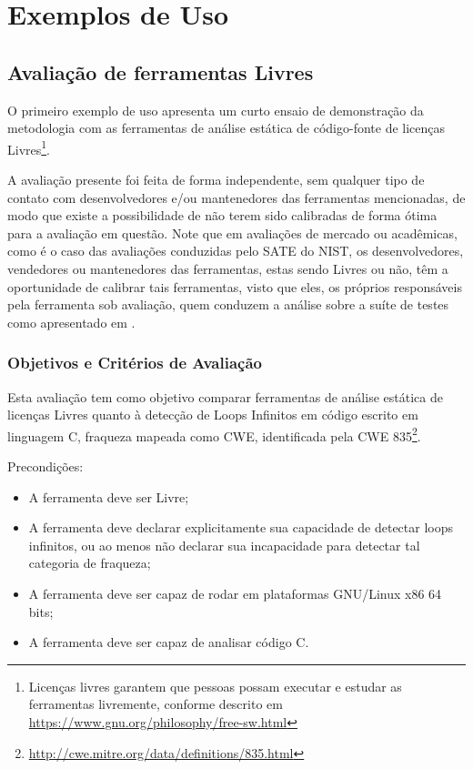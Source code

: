 \chapter{Exemplos de Uso}\label{exemplos_de_uso}

\section{Avaliação de ferramentas Livres}

O primeiro exemplo de uso apresenta um curto ensaio de demonstração da metodologia com as ferramentas de análise estática de código-fonte de licenças Livres\footnote{Licenças livres garantem que pessoas possam executar e estudar as ferramentas livremente, conforme descrito em \url{https://www.gnu.org/philosophy/free-sw.html}}. 

A avaliação presente foi feita de forma independente, sem qualquer tipo de contato com desenvolvedores e/ou mantenedores das ferramentas mencionadas, de modo que existe a possibilidade de não terem sido calibradas de forma ótima para a avaliação em questão. Note que em avaliações de mercado ou acadêmicas, como é o caso das avaliações conduzidas pelo SATE do NIST, os desenvolvedores, vendedores ou mantenedores das ferramentas, estas sendo Livres ou não, têm a oportunidade de calibrar tais ferramentas, visto que eles, os próprios responsáveis pela ferramenta sob avaliação, quem conduzem a análise sobre a suíte de testes como apresentado em \cite{sate_iv}.

\subsection{Objetivos e Critérios de Avaliação}

Esta avaliação tem como objetivo comparar ferramentas de análise estática de licenças Livres quanto à detecção de Loops Infinitos em código escrito em linguagem C, fraqueza mapeada como CWE, identificada pela CWE 835\footnote{\url{http://cwe.mitre.org/data/definitions/835.html}}.

Precondições:
\begin{itemize}
  \item A ferramenta deve ser Livre;
  \item A ferramenta deve declarar explicitamente sua capacidade de detectar loops infinitos, ou ao menos não declarar sua incapacidade para detectar tal categoria de fraqueza;
  \item A ferramenta deve ser capaz de rodar em plataformas GNU/Linux x86 64 bits;
  \item A ferramenta deve ser capaz de analisar código C.
\end{itemize}

